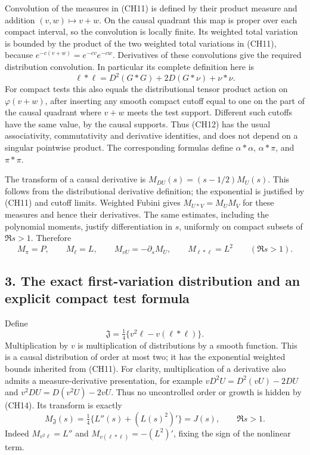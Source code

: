 \documentclass[
  10pt,
  a4paper,
]{article}
\begin{document}
Convolution of the measures in (CH11) is defined by their product
measure and addition \((v,w)\mapsto v+w\). On the causal quadrant this
map is proper over each compact interval, so the convolution is locally
finite. Its weighted total variation is bounded by the product of the
two weighted total variations in (CH11), because
\(e^{-c(v+w)}=e^{-cv}e^{-cw}\). Derivatives of these convolutions give
the required distribution convolution. In particular its complete
definition here is \[
\ell*\ell=D^2(G*G)+2D(G*\nu)+\nu*\nu.
\tag{CH12}
\] For compact tests this also equals the distributional tensor product
action on \(\varphi(v+w)\), after inserting any smooth compact cutoff
equal to one on the part of the causal quadrant where \(v+w\) meets the
test support. Different such cutoffs have the same value, by the causal
supports. Thus (CH12) has the usual associativity, commutativity and
derivative identities, and does not depend on a singular pointwise
product. The corresponding formulas define \(\alpha*\alpha\),
\(\alpha*\pi\), and \(\pi*\pi\).

The transform of a causal derivative is \(M_{DU}(s)=(s-1/2)M_U(s)\).
This follows from the distributional derivative definition; the
exponential is justified by (CH11) and cutoff limits. Weighted Fubini
gives \(M_{U*V}=M_UM_V\) for these measures and hence their derivatives.
The same estimates, including the polynomial moments, justify
differentiation in \(s\), uniformly on compact subsets of \(\Re s>1\).
Therefore \[
M_\pi=P,\qquad M_\ell=L,\qquad
M_{vU}=-\partial_sM_U,\qquad
M_{\ell*\ell}=L^2\qquad(\Re s>1).
\tag{CH13}
\]

\subsection{3. The exact first-variation distribution and an explicit
compact test
formula}\label{the-exact-first-variation-distribution-and-an-explicit-compact-test-formula}

Define \[
\boxed{\mathfrak J=\tfrac14\{v^2\ell-v(\ell*\ell)\}.}
\tag{CH14}
\] Multiplication by \(v\) is multiplication of distributions by a
smooth function. This is a causal distribution of order at most two; it
has the exponential weighted bounds inherited from (CH11). For clarity,
multiplication of a derivative also admits a measure-derivative
presentation, for example \(vD^2U=D^2(vU)-2DU\) and
\(v^2DU=D(v^2U)-2vU\). Thus no uncontrolled order or growth is hidden by
(CH14). Its transform is exactly \[
\boxed{M_{\mathfrak J}(s)=\tfrac14\{L''(s)+(L(s)^2)'\}=J(s),\qquad\Re s>1.}
\tag{CH15}
\] Indeed \(M_{v^2\ell}=L''\) and \(M_{v(\ell*\ell)}=-(L^2)'\), fixing
the sign of the nonlinear term.
\end{document}
